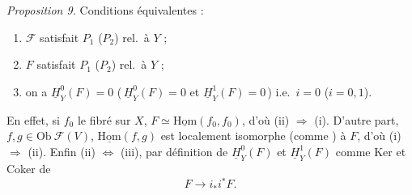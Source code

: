 \documentclass[11pt,a4paper]{article}
\begin{document}

\emph{Proposition 9.}  Conditions équivalentes :
\begin{enumerate}
  \item[(i)] $\mathcal{F}$ satisfait $P_1$ ($P_2$) rel.\ à $Y$ ;
  \item[(ii)] $F$ satisfait $P_1$ ($P_2$) rel.\ à $Y$ ;
  \item[(iii)] on a $\underline{H}^{0}_{Y}(F) = 0$
        (\,$\underline{H}^{0}_{Y}(F) = 0$ et
        $\underline{H}^{1}_{Y}(F) = 0$\,)
         i.e.\ $i = 0$
        ($i = 0, 1$).
\end{enumerate}

En effet,  si $f_0$ \ill{} le fibré \ill{} \ill{} sur $X$,
\ill{} $F \simeq \underline{\mathrm{Hom}}(f_0, f_0)$, d'où \ill{}
(ii) $\Longrightarrow$ (i). D'autre part, \ill{}
$f, g \in \mathrm{Ob}\ \mathcal{F}(V)$, $\underline{\mathrm{Hom}}(f,g)$ est
localement isomorphe (comme \ill{}) à $F$, d'où (i) $\Longrightarrow$ (ii).
Enfin (ii) $\Longleftrightarrow$ (iii), par définition de
$\underline{H}^{0}_{Y}(F)$ et $\underline{H}^{1}_{Y}(F)$ comme Ker et Coker de
\[
  F \longrightarrow i_{*} i^{*} F .
\]
\end{document}
